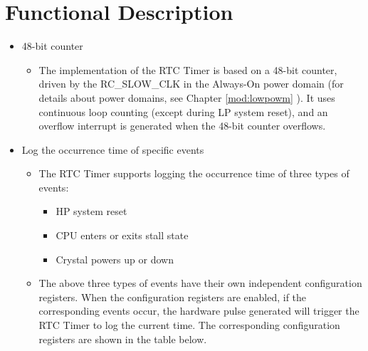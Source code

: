 \documentclass[main\_\_EN.tex]{subfiles}
\begin{document}

\section{Functional Description}
\label{sec:rtctimer-func-descr}

\begin{itemize}
    \item 48-bit counter
    \begin{itemize}
        \item The implementation of the RTC Timer is based on a 48-bit counter, driven by the RC\_SLOW\_CLK in the Always-On power domain (for details about power domains, see Chapter \ref{mod:lowpowm} \textit{}). It uses continuous loop counting (except during LP system reset), and an overflow interrupt is generated when the 48-bit counter overflows.
    \end{itemize}


    \item Log the occurrence time of specific events
    \begin{itemize}
        \item The RTC Timer supports logging the occurrence time of three types of events:
        \begin{itemize}
            \item HP system reset
            \item CPU enters or exits stall state
            \item Crystal powers up or down
        \end{itemize}
        \item The above three types of events have their own independent configuration registers. When the configuration registers are enabled, if the corresponding events occur, the hardware pulse generated will trigger the RTC Timer to log the current time. The corresponding configuration registers are shown in the table below.


\end{itemize}
\end{itemize}
\end{document}
